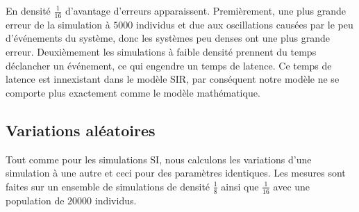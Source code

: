 En densité $\frac{1}{16}$ d'avantage d'erreurs apparaissent. Premièrement, une plus grande erreur de la simulation à $5000$ individus et due aux oscillations causées par le peu d'événements du système, donc les systèmes peu denses ont une plus grande erreur. Deuxièmement les simulations à faible densité prennent du temps déclancher un événement, ce qui engendre un temps de latence. Ce temps de latence est innexistant dans le modèle SIR, par conséquent notre modèle ne se comporte plus exactement comme le modèle mathématique.

\newpage

\subsection{Variations aléatoires}

Tout comme pour les simulations SI, nous calculons les variations d'une simulation à une autre et ceci pour des paramètres identiques. Les mesures sont faites sur un ensemble de simulations de densité $\frac{1}{8}$ ainsi que $\frac{1}{16}$ avec une population de $20000$ individus.

